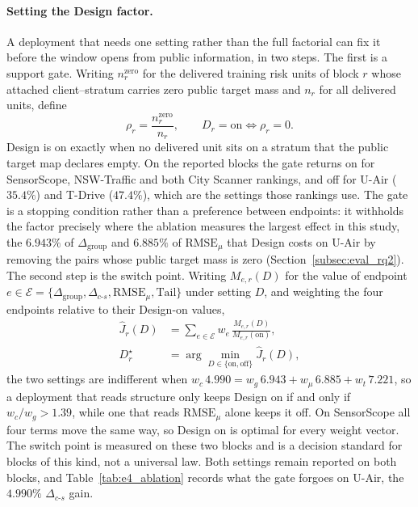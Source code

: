 \documentclass[letterpaper,journal]{IEEEtran}
\begin{document}
\paragraph{Setting the Design factor.}
A deployment that needs one setting rather than the full factorial can fix it
before the window opens from public information, in two steps.  The first is a
support gate.  Writing $n^{\mathrm{zero}}_r$ for the delivered training risk units
of block $r$ whose attached client--stratum carries zero public target mass and
$n_r$ for all delivered units, define
\begin{equation}
\rho_r=\frac{n^{\mathrm{zero}}_r}{n_r},
\qquad
D_r=\mathrm{on}\iff\rho_r=0 .
\label{eq:design_gate}
\end{equation}
Design is on exactly when no delivered unit sits on a stratum that the public
target map declares empty.  On the reported blocks the gate returns on for
SensorScope, NSW-Traffic and both City Scanner rankings, and off for U-Air
($35.4\%$) and T-Drive ($47.4\%$), which are the settings those rankings use.
The gate is a stopping condition rather than a preference between endpoints: it
withholds the factor precisely where the ablation measures the largest effect in
this study, the $6.943\%$ of $\Delta_{\mathrm{group}}$ and $6.885\%$ of
$\mathrm{RMSE}_{\mu}$ that Design costs on U-Air by removing the pairs whose
public target mass is zero (Section~\ref{subsec:eval_rq2}).  The second step is
the switch point.  Writing $M_{e,r}(D)$ for the value of endpoint
$e\in\mathcal{E}=\{\Delta_{\mathrm{group}},\Delta_{c\text{-}s},
\mathrm{RMSE}_{\mu},\mathrm{Tail}\}$ under setting $D$, and weighting the four
endpoints relative to their Design-on values,
\begin{equation}
\begin{aligned}
\widehat J_r(D)&=\sum_{e\in\mathcal{E}}w_e\,\frac{M_{e,r}(D)}{M_{e,r}(\mathrm{on})},\\
D_r^{\star}&=\arg\min_{D\in\{\mathrm{on},\mathrm{off}\}}\widehat J_r(D),
\end{aligned}
\label{eq:design_switch}
\end{equation}
the two settings are indifferent when
$w_c\,4.990=w_g\,6.943+w_\mu\,6.885+w_t\,7.221$, so a deployment that reads
structure only keeps Design on if and only if $w_c/w_g>1.39$, while one that
reads $\mathrm{RMSE}_{\mu}$ alone keeps it off.  On SensorScope all four terms
move the same way, so Design on is optimal for every weight vector.  The switch
point is measured on these two blocks and is a decision standard for blocks of
this kind, not a universal law.  Both settings remain reported on both blocks,
and Table~\ref{tab:e4_ablation} records what the gate forgoes on U-Air, the
$4.990\%$ $\Delta_{c\text{-}s}$ gain.
\end{document}

